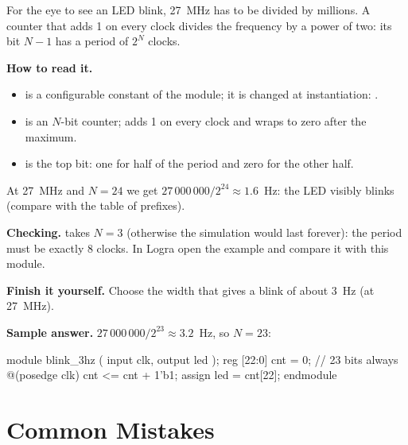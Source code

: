 For the eye to see an LED blink, 27~MHz has to be divided by millions. A counter
that adds 1 on every clock divides the frequency by a power of two: its bit
$N-1$ has a period of $2^N$ clocks.


\textbf{How to read it.}
\begin{itemize}
  \item {} is a configurable constant of the module; it is changed at instantiation: .
  \item {} is an $N$-bit counter;  adds 1 on every clock and wraps to zero after the maximum.
  \item {} is the top bit: one for half of the period and zero for the other half.
\end{itemize}
At 27~MHz and $N=24$ we get $27\,000\,000/2^{24}\approx 1.6$~Hz: the LED
visibly blinks (compare with the table of prefixes).

\textbf{Checking.}  takes $N=3$ (otherwise the
simulation would last forever): the period must be exactly 8 clocks. In Logra
open the  example and compare it with this module.

\textbf{Finish it yourself.} Choose the width that gives a blink of about
3~Hz (at 27~MHz).

\textbf{Sample answer.} $27\,000\,000/2^{23}\approx 3.2$~Hz, so $N=23$:
\begin{vcode}
module blink_3hz (
    input  clk,
    output led
);
    reg [22:0] cnt = 0;                   // 23 bits
    always @(posedge clk) cnt <= cnt + 1'b1;
    assign led = cnt[22];
endmodule
\end{vcode}

\section{Common Mistakes}

